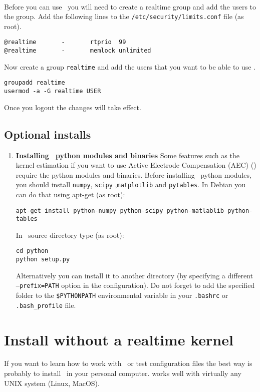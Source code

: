 \paragraph{}
Before you can use \progname\ you will need to create a realtime group and add the users to the group.
Add the following lines to the \texttt{/etc/security/limits.conf} file (as root).
\begin{lstlisting}
@realtime       -       rtprio  99
@realtime       -       memlock unlimited
\end{lstlisting}
Now create a group \texttt{realtime} and add the users that you want to be able to use \progname.

\begin{lstlisting}
groupadd realtime
usermod -a -G realtime USER
\end{lstlisting}

Once you logout the changes will take effect.

\subsection{Optional installs} 
\label{install:optional}
\begin{enumerate}
\item \textbf{Installing \progname\ python modules and binaries}
Some features such as the kernel estimation if you want to use Active Electrode Compensation (AEC) (\cite{Brette:2008}) require the python modules and binaries.
Before installing \progname\ python modules, you should install \texttt{numpy}, \texttt{scipy} ,\texttt{matplotlib} and \texttt{pytables}. In Debian you can do that using apt-get (as root): 
\begin{lstlisting}
apt-get install python-numpy python-scipy python-matlablib python-tables
\end{lstlisting}

In \progname\ source directory type (as root):
\begin{lstlisting}
cd python
python setup.py
\end{lstlisting}
Alternatively you can install it to another directory (by specifying a different \texttt{--prefix=PATH} option in the configuration). Do not forget to add the specified folder to the \texttt{\$PYTHONPATH} environmental variable in your \texttt{.bashrc} or \texttt{.bash\_profile} file.

\end{enumerate}

\section{Install without a realtime kernel}
\label{install:nokernel}
If you want to learn how to work with \progname\ or test configuration files the best way is probably to install \progname\ in your personal computer. \textbf{\progname} works well with virtually any UNIX system (Linux, MacOS). 
